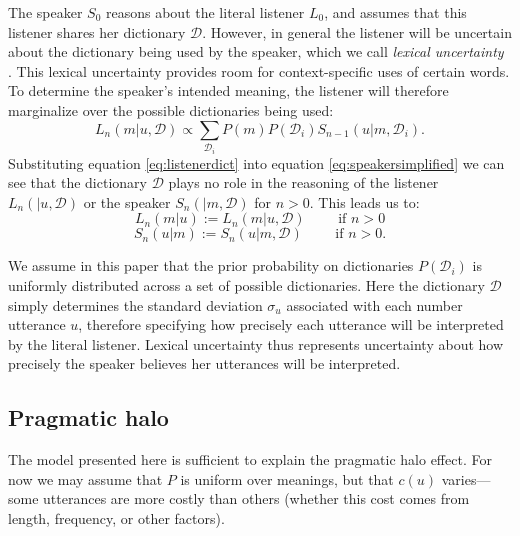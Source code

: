 \documentclass{article} %
\newcommand{\dictionary}{\ensuremath{\mathcal{D}}\xspace}
\begin{document}
The speaker $S_0$ reasons about the literal listener $L_0$, and assumes that this listener shares her dictionary $\dictionary$. However, in general the listener will be uncertain about the dictionary being used by the speaker, which we call \emph{lexical uncertainty} \cite{bergen2012}. This lexical uncertainty provides room for context-specific uses of certain words. To determine the speaker's intended meaning, the listener will therefore marginalize over the possible dictionaries being used:
\begin{equation}\label{eq:listenerdict}
L_n(m|u,\dictionary) \propto \sum_{\dictionary_i }P(m)P(\dictionary_i)S_{n-1}(u | m,\dictionary_i).
\end{equation}
Substituting equation \ref{eq:listenerdict} into equation \ref{eq:speakersimplified} we can see that the dictionary $\dictionary$ plays no role in the reasoning of the listener $L_n(|u,\dictionary)$ or the speaker $S_n(| m, \dictionary)$ for $n>0$. This leads us to:
\begin{equation}
  L_n(m | u) :=  L_n(m | u, \dictionary) \text{ ~~~~~ if $n > 0$}
\end{equation}
\begin{equation}
  S_n(u | m) :=  S_n(u | m, \dictionary) \text{ ~~~~~ if $n > 0$.}
\end{equation}

We assume in this paper that the prior probability on dictionaries $P(\dictionary_i)$ is uniformly distributed across a set of possible dictionaries. 
Here the dictionary $\dictionary$ simply determines the standard deviation $\sigma_u$ associated with each number utterance $u$, therefore specifying how precisely each utterance will be interpreted by the literal listener. Lexical uncertainty thus represents uncertainty about how precisely the speaker believes her utterances will be interpreted. 


\subsection{Pragmatic halo}

The model presented here is sufficient to explain the pragmatic halo effect. For now we may assume that $P$ is uniform over meanings, but that $c(u)$ varies---some utterances are more costly than others (whether this cost comes from length, frequency, or other factors).
\end{document}
